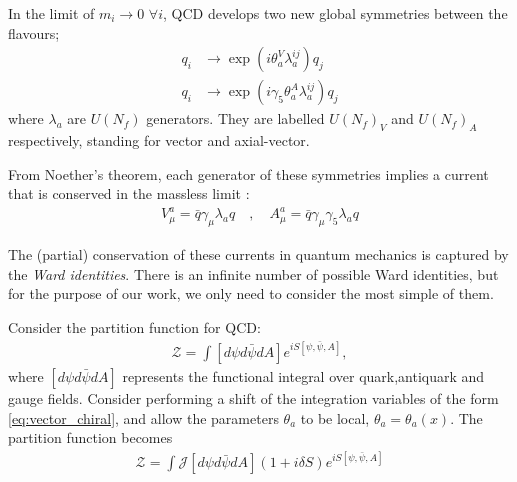 In the limit of $m_i\to 0\,\,\forall i$, QCD develops two new global symmetries between the flavours;
\begin{align}
  \label{eq:vector_chiral}
  q_i &\to \exp(i\theta_a^V \lambda^{ij}_a) q_j \\
  q_i &\to \exp(i\gamma_5 \theta_a^A \lambda^{ij}_a) q_j
\end{align}
where $\lambda_a$ are $U(N_f)$ generators. They are labelled $U(N_f)_V$ and $U(N_f)_A$ respectively, standing for vector and axial-vector.

From Noether's theorem, each generator of these symmetries implies a current that is conserved in the massless limit \cite{Scherer:2002tk}:
\begin{align}
  \label{eq:chiralcurrents}
  V_{\mu}^a = \bar{q} \gamma_{\mu} \lambda_a q \quad,\quad
  A_{\mu}^a = \bar{q} \gamma_{\mu} \gamma_5 \lambda_a q
\end{align}

The (partial) conservation of these currents in quantum mechanics is captured by the {\it{Ward identities}}. There is an infinite number of possible Ward identities, but for the purpose of our work, we only need to consider the most simple of them. %

Consider the partition function for QCD:
\begin{align}
  \mathcal{Z} = \int [d\psi d\bar{\psi} dA] e^{iS[\psi,\bar{\psi},A]},
\end{align}
where $[d\psi d\bar{\psi} dA]$ represents the functional integral over quark,antiquark and gauge fields. Consider performing a shift of the integration variables of the form \eqref{eq:vector_chiral}, and allow the parameters $\theta_a$ to be local, $\theta_a=\theta_a(x)$. The partition function becomes
\begin{align}
  \mathcal{Z} = \int \mathcal{J} [d\psi d\bar{\psi} dA] ( 1 + i\delta S ) e^{iS[\psi,\bar{\psi},A]}
  \label{eq:partition_transformed}
\end{align}

